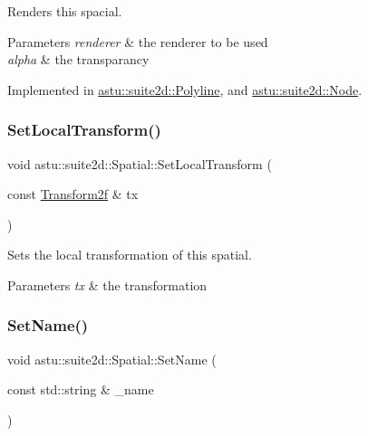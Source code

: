 Renders this spacial.


\begin{DoxyParams}{Parameters}
{\em renderer} & the renderer to be used \\
\hline
{\em alpha} & the transparancy \\
\hline
\end{DoxyParams}


Implemented in \hyperlink{classastu_1_1suite2d_1_1Polyline_ad4aef126b57b93beba4ab03c01403406}{astu\+::suite2d\+::\+Polyline}, and \hyperlink{classastu_1_1suite2d_1_1Node_a01bac6ed4eab4a6c77e1dac7d30d09e6}{astu\+::suite2d\+::\+Node}.

\mbox{\label{classastu_1_1suite2d_1_1Spatial_a3cf75241f2921077a66810175e5f6071}} 
\subsubsection{\texorpdfstring{Set\+Local\+Transform()}{SetLocalTransform()}}
{\footnotesize\ttfamily void astu\+::suite2d\+::\+Spatial\+::\+Set\+Local\+Transform (\begin{DoxyParamCaption}\item[{const \hyperlink{group__math__group_gac67b5e9d27308a01ea8190ecb15e08fa}{Transform2f} \&}]{tx }\end{DoxyParamCaption})\hspace{0.3cm}{\ttfamily [inline]}}

Sets the local transformation of this spatial.


\begin{DoxyParams}{Parameters}
{\em tx} & the transformation \\
\hline
\end{DoxyParams}
\mbox{\label{classastu_1_1suite2d_1_1Spatial_a938e9e652d177955245a8ce92e1133cb}} 
\subsubsection{\texorpdfstring{Set\+Name()}{SetName()}}
{\footnotesize\ttfamily void astu\+::suite2d\+::\+Spatial\+::\+Set\+Name (\begin{DoxyParamCaption}\item[{const std\+::string \&}]{\+\_\+name }\end{DoxyParamCaption})\hspace{0.3cm}{\ttfamily [inline]}}

